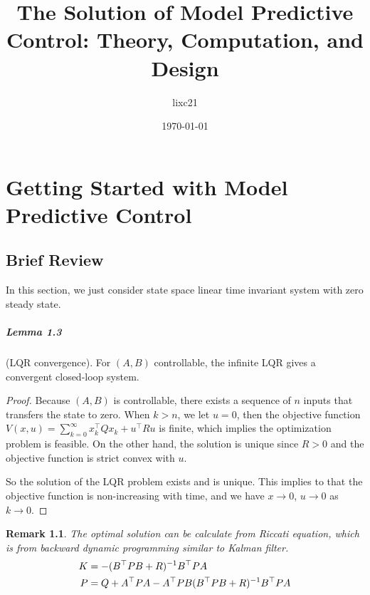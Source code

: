 \documentclass[11pt,a4paper]{report}
\title{The Solution of Model Predictive Control: Theory, Computation, and Design \cite{rawlings2017model}}
\author{lixc21}
\date{\today}
\newtheorem*{remark}{Remark}
\theoremstyle{definition}\newtheorem{exercise}{Exercise}[chapter]
\begin{document}
\maketitle

\chapter{Getting Started with Model Predictive Control}
\section{Brief Review}
In this section, we just consider state space linear time invariant system with zero steady state.

\paragraph{Lemma 1.3} (LQR convergence). For $(A,B)$ controllable, the infinite LQR gives a convergent closed-loop system.
\begin{proof}
Because $(A,B)$ is controllable, there exists a sequence of $n$ inputs that transfers the state to zero. When $k>n$, we let $u=0$, then the objective function $V(x,u)=\sum_{k=0}^\infty x_k^\top Qx_k+u^\top Ru$ is finite, which implies the optimization problem is feasible. On the other hand, the solution is unique since $R>0$ and the objective function is strict convex with $u$.

So the solution of the LQR problem exists and is unique. This implies to that the objective function is non-increasing with time, and we have $x\to 0$, $u\to 0$ as $k\to 0$.
\end{proof}
\begin{remark}
The optimal solution can be calculate from Riccati equation, which is from backward dynamic programming similar to Kalman filter.
\begin{equation}\notag
\begin{aligned}
K&=-(B^\top PB+R)^{-1} B^\top PA\\
P&=Q+A^\top PA-A^\top PB(B^\top PB+R)^{-1}B^\top PA
\end{aligned}
\end{equation}
\end{remark}
\end{document}

